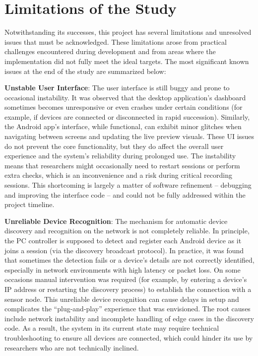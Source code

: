 \section{Limitations of the Study}

Notwithstanding its successes, this project has several limitations and unresolved issues that must be acknowledged. These limitations arose from practical challenges encountered during development and from areas where the implementation did not fully meet the ideal targets. The most significant known issues at the end of the study are summarized below:

\textbf{Unstable User Interface}: The user interface is still buggy and prone to occasional instability. It was observed that the desktop application's dashboard sometimes becomes unresponsive or even crashes under certain conditions (for example, if devices are connected or disconnected in rapid succession). Similarly, the Android app's interface, while functional, can exhibit minor glitches when navigating between screens and updating the live preview visuals. These UI issues do not prevent the core functionality, but they do affect the overall user experience and the system's reliability during prolonged use. The instability means that researchers might occasionally need to restart sessions or perform extra checks, which is an inconvenience and a risk during critical recording sessions. This shortcoming is largely a matter of software refinement -- debugging and improving the interface code -- and could not be fully addressed within the project timeline.

\textbf{Unreliable Device Recognition}: The mechanism for automatic device discovery and recognition on the network is not completely reliable. In principle, the PC controller is supposed to detect and register each Android device as it joins a session (via the discovery broadcast protocol). In practice, it was found that sometimes the detection fails or a device's details are not correctly identified, especially in network environments with high latency or packet loss. On some occasions manual intervention was required (for example, by entering a device's IP address or restarting the discovery process) to establish the connection with a sensor node. This unreliable device recognition can cause delays in setup and complicates the ``plug-and-play'' experience that was envisioned. The root causes include network instability and incomplete handling of edge cases in the discovery code. As a result, the system in its current state may require technical troubleshooting to ensure all devices are connected, which could hinder its use by researchers who are not technically inclined.

